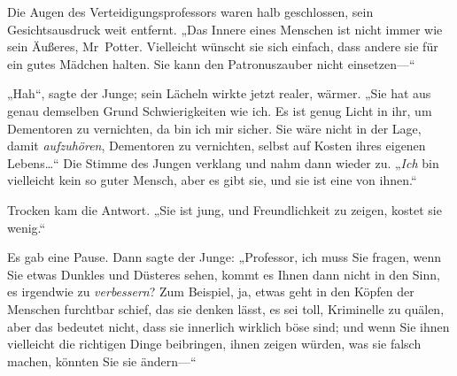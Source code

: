 Die Augen des Verteidigungsprofessors waren halb geschlossen, sein Gesichtsausdruck weit entfernt. „Das Innere eines Menschen ist nicht immer wie sein Äußeres, Mr~Potter. Vielleicht wünscht sie sich einfach, dass andere sie für ein gutes Mädchen halten. Sie kann den Patronuszauber nicht einsetzen—“

„Hah“, sagte der Junge; sein Lächeln wirkte jetzt realer, wärmer. „Sie hat aus genau demselben Grund Schwierigkeiten wie ich. Es ist genug Licht in ihr, um Dementoren zu vernichten, da bin ich mir sicher. Sie wäre nicht in der Lage, damit \emph{aufzuhören}, Dementoren zu vernichten, selbst auf Kosten ihres eigenen Lebens…“ Die Stimme des Jungen verklang und nahm dann wieder zu. „\emph{Ich} bin vielleicht kein so guter Mensch, aber es gibt sie, und sie ist eine von ihnen.“

Trocken kam die Antwort. „Sie ist jung, und Freundlichkeit zu zeigen, kostet sie wenig.“

Es gab eine Pause. Dann sagte der Junge: „Professor, ich muss Sie fragen, wenn Sie etwas Dunkles und Düsteres sehen, kommt es Ihnen dann nicht in den Sinn, es irgendwie zu \emph{verbessern}? Zum Beispiel, ja, etwas geht in den Köpfen der Menschen furchtbar schief, das sie denken lässt, es sei toll, Kriminelle zu quälen, aber das bedeutet nicht, dass sie innerlich wirklich böse sind; und wenn Sie ihnen vielleicht die richtigen Dinge beibringen, ihnen zeigen würden, was sie falsch machen, könnten Sie sie ändern—“

